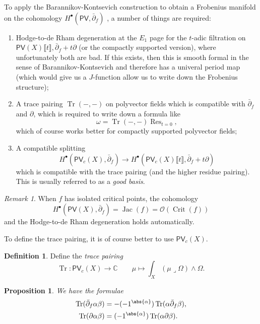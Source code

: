 \documentclass{amsart}
\newtheorem{prop}[thm]{Proposition}
\theoremstyle{definition}
\newtheorem{defn}[thm]{Definition}
\theoremstyle{remark}
\newtheorem{rmk}[thm]{Remark}
\theoremstyle{plain}
\theoremstyle{definition}
\theoremstyle{remark}
\newcommand{\C}{\mathbb{C}}
\newcommand{\mc}[1]{\mathcal{#1}}
\newcommand{\on}[1]{\operatorname{#1}}
\newcommand{\ms}[1]{\mathsf{#1}}
\newcommand{\1}{\mathbf{1}}
\newcommand{\2}{\mathbf{2}}
\newcommand{\3}{\mathbf{3}}
\newcommand{\ps}[1]{\lBrack #1 \rBrack}
\newcommand{\dbar}{\bar{\partial}}
\DeclareMathOperator{\Crit}{Crit}
\begin{document}
To apply the Barannikov-Kontsevich construction to obtain a Frobenius manifold on the cohomology \(H^{\bullet}(\ms{PV}, \dbar_f)\) , a number of things are required:
\begin{enumerate}
    \item Hodge-to-de Rham degeneration at the \(E_1\) page for the \(t\)-adic filtration on \(\ms{PV}(X) \ps{t}, \dbar_f + t \partial\) (or the compactly supported version), where unfortunately both are bad. If this exists, then this is smooth formal in the sense of Barannikov-Kontsevich and therefore has a univeral period map (which would give us a \(J\)-function allow us to write down the Frobenius structure);
    \item A trace pairing \(\on{Tr}(-,-)\) on polyvector fields which is compatible with \(\dbar_f\) and \(\partial\), which is required to write down a formula like
    \[ \omega = \on{Tr}(-,-) \on{Res}_{t = 0}, \]
    which of course works better for compactly supported polyvector fields;
    \item A compatible splitting
    \[ H^{\bullet}(\ms{PV}_c(X), \dbar_f) \to H^{\bullet}(\ms{PV}_c(X) \ps{t}, \dbar_f + t \partial) \]
    which is compatible with the trace pairing (and the higher residue pairing). This is usually referred to as a \textit{good basis}.
\end{enumerate}

\begin{rmk}
    When \(f\) has isolated critical points, the cohomology 
    \[ H^{\bullet}(\ms{PV}(X), \dbar_f) = \on{Jac}(f) = \mc{O}(\Crit(f)) \]
    and the Hodge-to-de Rham degeneration holds automatically.
\end{rmk}

To define the trace pairing, it is of course better to use \(\ms{PV}_c(X)\).

\begin{defn}
    Define the \textit{trace pairing}
    \[ \on{Tr} \colon \ms{PV}_c(X) \to \C \qquad \mu \mapsto \int_X (\mu \lrcorner \Omega) \wedge \Omega. \]
\end{defn}

\begin{prop}
    We have the formulae
    \begin{align*}
        \on{Tr}(\dbar_f \alpha \beta) &= -(-1^{\abs{\alpha}}) \on{Tr}(\alpha \dbar_f \beta), \\
        \on{Tr}(\partial \alpha \beta) &= (-1^{\abs{\alpha}}) \on{Tr}(\alpha \partial \beta).
    \end{align*}
\end{prop}
\end{document}
